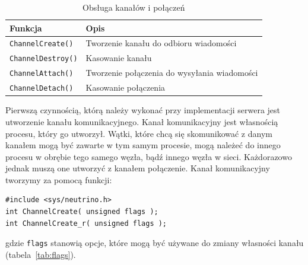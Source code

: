 \begin{table}[h!]
\centering
\caption{Obsługa kanałów i połączeń}
\setlength{\arrayrulewidth}{1pt}
\setlength{\tabcolsep}{6pt}
\renewcommand{\arraystretch}{1.2}
\begin{tabular}{ |p{}|p{}|}
\hline \rowcolor{gray}
\textbf{Funkcja} & \textbf{Opis} \\ \hline
\mbox{\lstinline[style=MyCStyle]{ChannelCreate()}} & Tworzenie kanału do odbioru wiadomości \\ \hline
\mbox{\lstinline[style=MyCStyle]{ChannelDestroy()}} & Kasowanie kanału \\ \hline
\mbox{\lstinline[style=MyCStyle]{ChannelAttach()}} & Tworzenie połączenia do wysyłania wiadomości \\ \hline
\mbox{\lstinline[style=MyCStyle]{ChannelDetach()}} & Kasowanie połączenia \\ \hline
\end{tabular}
\label{tab:channels}
\end{table}

Pierwszą czynnością, którą należy wykonać przy implementacji serwera jest utworzenie kanału komunikacyjnego. Kanał komunikacyjny jest własnością procesu, który go utworzył. Wątki, które chcą się skomunikować z danym kanałem mogą być zawarte w tym samym procesie, mogą należeć do innego procesu w obrębie tego samego węzła, bądź innego węzła w sieci. Każdorazowo jednak muszą one utworzyć z kanałem połączenie. Kanał komunikacyjny tworzymy za pomocą funkcji:

\begin{lstlisting}[style=MyCStyle]
#include <sys/neutrino.h>
int ChannelCreate( unsigned flags );
int ChannelCreate_r( unsigned flags );
\end{lstlisting}

gdzie \lstinline[style=MyCStyle]{flags} stanowią opcje, które mogą być używane do zmiany własności kanału (tabela~\ref{tab:flags}). 

